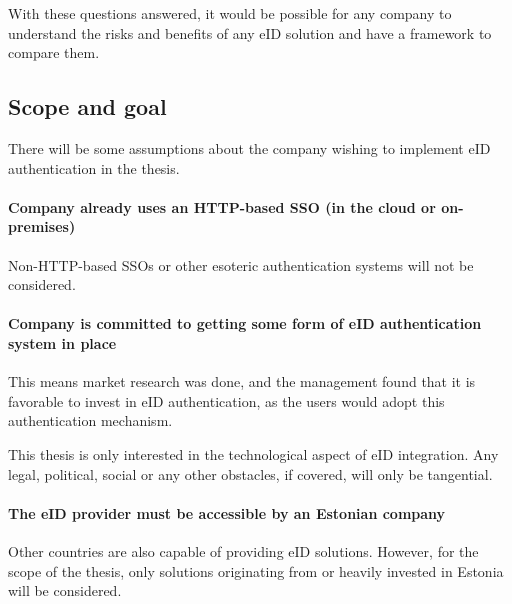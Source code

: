 With these questions answered, it would be possible for any company to understand the risks and benefits of any eID solution and have a framework to compare them.

\subsection{Scope and goal}

There will be some assumptions about the company wishing to implement eID authentication in the thesis.

\paragraph{Company already uses an HTTP-based SSO (in the cloud or on-premises)} Non-HTTP-based SSOs or other esoteric authentication systems will not be considered.

\paragraph{Company is committed to getting some form of eID authentication system in place} This means market research was done, and the management found that it is favorable to invest in eID authentication, as the users would adopt this authentication mechanism.

This thesis is only interested in the technological aspect of eID integration. Any legal, political, social or any other obstacles, if covered, will only be tangential.

\paragraph{The eID provider must be accessible by an Estonian company} Other countries are also capable of providing eID solutions. However, for the scope of the thesis, only solutions originating from or heavily invested in Estonia will be considered.






